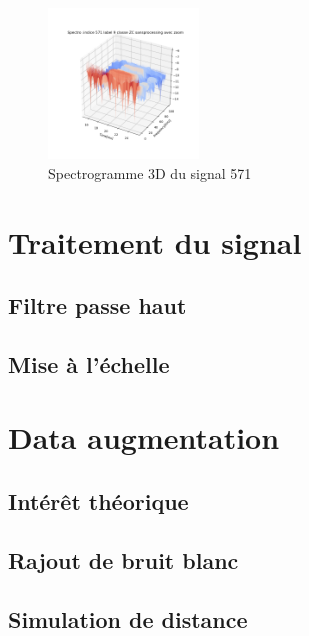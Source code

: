 \begin{figure}[!h]
\centering
\includegraphics[width=4cm]{./images/indice571Spectro3Dlabel9classeZCsansprocessingaveczoom.png}
\caption{Spectrogramme 3D du signal 571}
\end{figure}

\hypertarget{Traitement-du-signal}{%
\section{Traitement du signal}
\label{Traitement-du-signal}}

\hypertarget{Filtre-passe-haut}{%
\subsection{Filtre passe haut}
\label{Filtre-passe-haut}}

\hypertarget{}{%
\subsection{Mise à l'échelle}
\label{}}

\hypertarget{Data-augmentation}{%
\section{Data augmentation}
\label{Data-augmentation}}

\hypertarget{}{%
\subsection{Intérêt théorique}
\label{}}

\hypertarget{Rajout-de-bruit-blanc}{%
\subsection{Rajout de bruit blanc}
\label{Rajout-de-bruit-blanc}}

\hypertarget{Simulation-de-distance}{%
\subsection{Simulation de distance}
\label{Simulation-de-distance}}

